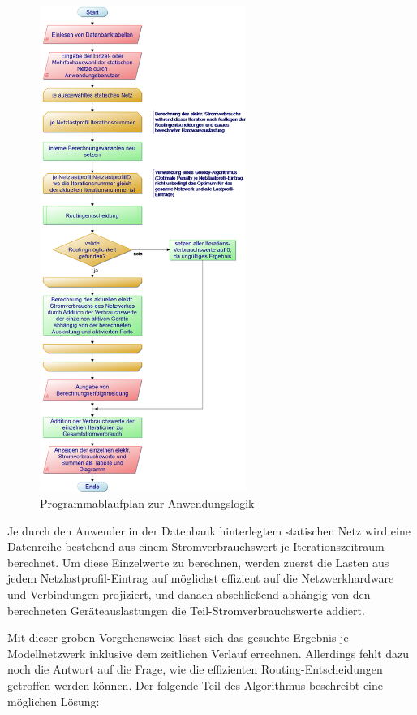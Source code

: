 \documentclass[12pt,titlepage]{article}
\begin{document}
\begin{figure}[!ht]
	\centering
	\includegraphics[width=0.6\textwidth]{1Berechnung_elektr_Stromverbrauch}
	\caption{Programmablaufplan zur Anwendungslogik}
	\label{fig:1Berechnung_elektr_Stromverbrauch}
\end{figure}


Je durch den Anwender in der Datenbank hinterlegtem statischen Netz wird eine Datenreihe bestehend aus einem Stromverbrauchswert je Iterationszeitraum berechnet.
Um diese Einzelwerte zu berechnen, werden zuerst die Lasten aus jedem Netzlastprofil-Eintrag auf möglichst effizient auf die Netzwerkhardware und Verbindungen projiziert, und danach abschließend abhängig von den berechneten Geräteauslastungen die Teil-Stromverbrauchswerte addiert.


Mit dieser groben Vorgehensweise lässt sich das gesuchte Ergebnis je Modellnetzwerk inklusive dem zeitlichen Verlauf errechnen. Allerdings fehlt dazu noch die Antwort auf die Frage, wie die effizienten Routing-Entscheidungen getroffen werden können. Der folgende Teil des Algorithmus beschreibt eine möglichen Lösung:
\end{document}
